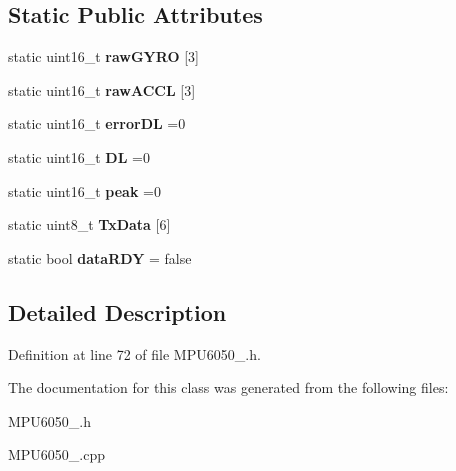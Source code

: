 \subsection*{Static Public Attributes}
\begin{DoxyCompactItemize}
\item 
\mbox{\label{classSensors_1_1MPU6050_a9e1b7e7fae58eda13a4a01dace4dce31}} 
static uint16\+\_\+t {\bfseries raw\+G\+Y\+RO} \mbox{[}3\mbox{]}
\item 
\mbox{\label{classSensors_1_1MPU6050_ac65f4884966872a95ed292a86419be41}} 
static uint16\+\_\+t {\bfseries raw\+A\+C\+CL} \mbox{[}3\mbox{]}
\item 
\mbox{\label{classSensors_1_1MPU6050_a23ca89d6631e30ffe5bc70196f991bba}} 
static uint16\+\_\+t {\bfseries error\+DL} =0
\item 
\mbox{\label{classSensors_1_1MPU6050_a0a14bd353bb0ef0828c8a97a31759c9f}} 
static uint16\+\_\+t {\bfseries DL} =0
\item 
\mbox{\label{classSensors_1_1MPU6050_ad3fcb168d63e452bfa871672a10ea27b}} 
static uint16\+\_\+t {\bfseries peak} =0
\item 
\mbox{\label{classSensors_1_1MPU6050_a0824a5a6c37256c078dd861fbe5678f6}} 
static uint8\+\_\+t {\bfseries Tx\+Data} \mbox{[}6\mbox{]}
\item 
\mbox{\label{classSensors_1_1MPU6050_a8f379aeb0bbbc448d9393419ac489e94}} 
static bool {\bfseries data\+R\+DY} = false
\end{DoxyCompactItemize}


\subsection{Detailed Description}


Definition at line 72 of file M\+P\+U6050\+\_\+.\+h.



The documentation for this class was generated from the following files\+:\begin{DoxyCompactItemize}
\item 
M\+P\+U6050\+\_\+.\+h\item 
M\+P\+U6050\+\_\+.\+cpp\end{DoxyCompactItemize}

